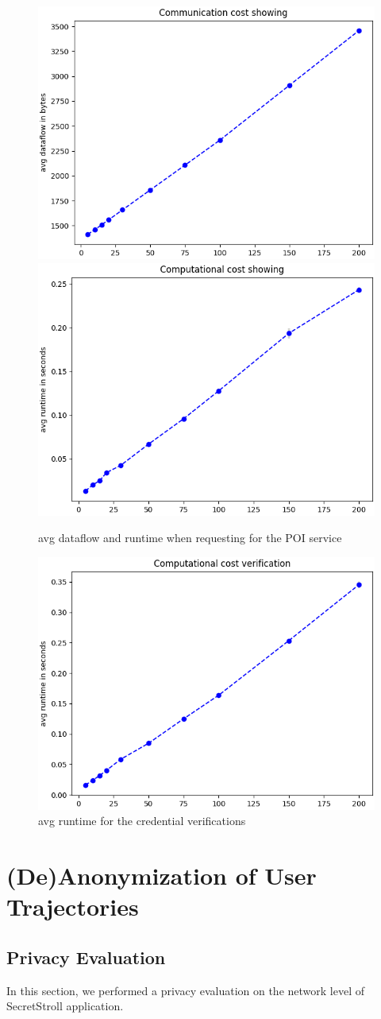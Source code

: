 \documentclass[10pt,conference,compsocconf]{IEEEtran}
\begin{document}
\begin{figure}[h!]
    \includegraphics[width=0.49\linewidth]{../performance_analysis/dataflow_showing.png}
    \includegraphics[width=0.49\linewidth]{../performance_analysis/runtime_showing.png}
    \caption{avg dataflow and runtime when requesting for the POI service}
    \label{fig:showing}
\end{figure}

\begin{figure}[h!]
    \includegraphics[width=0.49\linewidth]{../performance_analysis/runtime_verification}
    \caption{avg runtime for the credential verifications}
    \label{fig:verify}
\end{figure}


\section{(De)Anonymization of User Trajectories}

\subsection{Privacy Evaluation}
In this section, we performed a privacy evaluation on the network level of
SecretStroll application.
\end{document}
